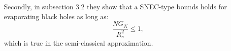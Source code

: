 Secondly, in subsection \(3.2\) they show that a SNEC-type bounds holds for evaporating black holes as long as:
\[
\frac{NG_N}{R_s^2} \le 1,     
\]
which is true in the semi-classical approximation.

	
	
	

	
	
	
	
	



